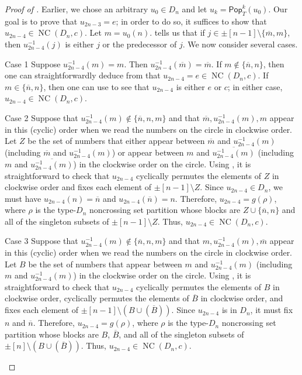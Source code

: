 \documentclass[10pt,a4paper]{amsart}
\newenvironment{enonce*}[2][remark]{\par\medskip\noindent\textit{#2.}\ }{\par}
\newcommand{\pop}{\mathsf{Pop}}
\DeclareMathOperator{\NC}{NC}
\begin{document}
\begin{proof}[Proof of ]
Earlier, we chose an arbitrary $u_0\in D_n$ and let $u_k=\pop_T^k(u_0)$. Our goal is to prove that $u_{2n-3}=e$; in order to do so, it suffices to show that $u_{2n-4}\in\NC(D_n,c)$. Let $m=u_0(n)$.  tells us that if $j\in\pm[n-1]\setminus\{\overline m,m\}$, then $u_{2n-4}^{-1}(j)$ is either $j$ or the predecessor of $j$. We now consider several cases. 




\begin{enonce*}[remark]{Case 1} Suppose $u_{2n-4}^{-1}(m)=m$. Then $u_{2n-4}^{-1}(\overline m)=\overline m$. If $m\not\in\{\overline n,n\}$, then one can straightforwardly deduce from  that $u_{2n-4}=e\in\NC(D_n,c)$. If $m\in\{\overline n,n\}$, then one can use  to see that $u_{2n-4}$ is either $e$ or $c$; in either case, $u_{2n-4}\in\NC(D_n,c)$. 
\end{enonce*}

\begin{enonce*}[remark]{Case 2} Suppose that $u_{2n-4}^{-1}(m)\not\in\{\overline n,n,m\}$ and that $\overline m, u_{2n-4}^{-1}(m),m$ appear in this (cyclic) order when we read the numbers on the circle in clockwise order. Let $Z$ be the set of numbers that either appear between $\overline m$ and $u_{2n-4}^{-1}(m)$ (including $\overline m$ and $u_{2n-4}^{-1}(m)$) or appear between $m$ and $\overline{u_{2n-4}^{-1}(m)}$ (including $m$ and $\overline{u_{2n-4}^{-1}(m)}$) in the clockwise order on the circle. Using , it is straightforward to check that $u_{2n-4}$ cyclically permutes the elements of $Z$ in clockwise order and fixes each element of $\pm[n-1]\setminus Z$. Since $u_{2n-4}\in D_n$, we must have $u_{2n-4}(n)=\overline n$ and $u_{2n-4}(\overline n)=n$. Therefore, $u_{2n-4}=g(\rho)$, where $\rho$ is the type-$D_n$ noncrossing set partition whose blocks are $Z\cup\{\overline n,n\}$ and all of the singleton subsets of $\pm[n-1]\setminus Z$. Thus, $u_{2n-4}\in\NC(D_n,c)$. 
\end{enonce*}

\begin{enonce*}[remark]{Case 3} Suppose that $u_{2n-4}^{-1}(m)\not\in\{\overline n,n,m\}$ and that $m, u_{2n-4}^{-1}(m),\overline m$ appear in this (cyclic) order when we read the numbers on the circle in clockwise order. Let $B$ be the set of numbers that appear between $m$ and $u_{2n-4}^{-1}(m)$ (including $m$ and $u_{2n-4}^{-1}(m)$) in the clockwise order on the circle. Using , it is straightforward to check that $u_{2n-4}$ cyclically permutes the elements of $B$ in clockwise order, cyclically permutes the elements of $\overline B$ in clockwise order, and fixes each element of $\pm[n-1]\setminus (B\cup(\overline B))$. Since $u_{2n-4}$ is in $ D_n$, it must fix $n$ and $\overline n$. Therefore, $u_{2n-4}=g(\rho)$, where $\rho$ is the type-$D_n$ noncrossing set partition whose blocks are $B$, $\overline B$, and all of the singleton subsets of $\pm[n]\setminus (B\cup(\overline B))$. Thus, $u_{2n-4}\in\NC(D_n,c)$.
\end{enonce*}


\end{proof}
\end{document}
